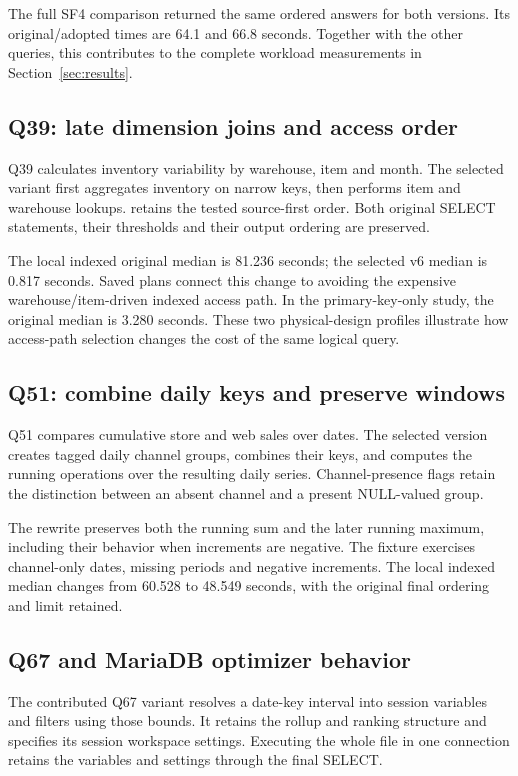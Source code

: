 \documentclass[11pt,a4paper]{article}
\DeclareRobustCommand{\file}[1]{\path{#1}}
\begin{document}
The full SF4 comparison returned the same ordered answers for both versions.
Its original/adopted times are 64.1 and 66.8 seconds. Together with the other
queries, this contributes to the complete workload measurements in
Section~\ref{sec:results}.

\subsection{Q39: late dimension joins and access order}
Q39 calculates inventory variability by warehouse, item and month. The selected
variant first aggregates inventory on narrow keys, then performs item and
warehouse lookups. \file{STRAIGHT_JOIN} retains the tested source-first order.
Both original SELECT statements, their thresholds and their output ordering
are preserved.

The local indexed original median is 81.236 seconds; the selected v6 median
is 0.817 seconds. Saved plans connect this change to avoiding the expensive
warehouse/item-driven indexed access path. In the primary-key-only study,
the original median is 3.280 seconds. These two physical-design profiles
illustrate how access-path selection changes the cost of the same logical
query.

\subsection{Q51: combine daily keys and preserve windows}
Q51 compares cumulative store and web sales over dates. The selected version
creates tagged daily channel groups, combines their keys, and computes the
running operations over the resulting daily series. Channel-presence flags
retain the distinction between an absent channel and a present NULL-valued
group.

The rewrite preserves both the running sum and the later running maximum,
including their behavior when increments are negative. The fixture exercises
channel-only dates, missing periods and negative increments. The local indexed
median changes from 60.528 to 48.549 seconds, with the original final ordering
and limit retained.

\subsection{Q67 and MariaDB optimizer behavior}
The contributed Q67 variant resolves a date-key interval into session variables
and filters \file{store_sales} using those bounds. It retains the rollup and
ranking structure and specifies its session workspace settings. Executing the
whole file in one connection retains the variables and settings through the
final SELECT.
\end{document}
